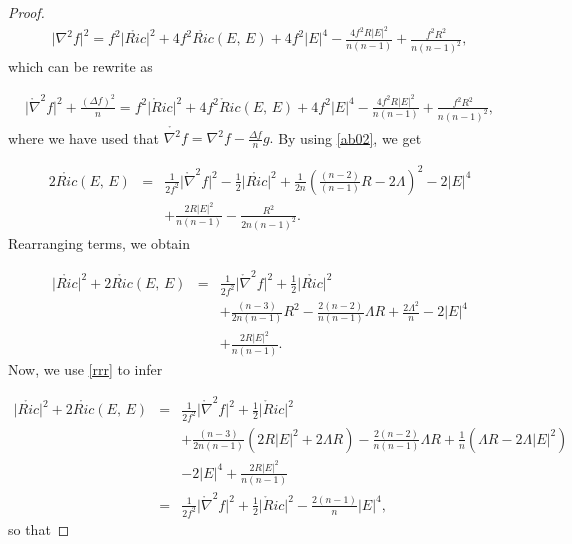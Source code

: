 \documentclass{amsart}
\numberwithin{equation}{section}
\begin{document}
\begin{proof}
		
		\begin{eqnarray*}
			\vert\nabla^2f\vert^{2} = f^2\vert\mathring{Ric}\vert^{2} + 4f^2\mathring{Ric}(E,\,E) + 4f^2\vert E\vert^{4} - \frac{4f^2R\vert E\vert^{2}}{n(n-1)} + \frac{f^2R^2}{n(n-1)^2},
		\end{eqnarray*} which can be rewrite as 
		
				
		\begin{eqnarray*}
			\vert\mathring{\nabla}^2f\vert^{2} + \frac{(\Delta f)^{2}}{n} = f^2\vert\mathring{R}ic\vert^{2} + 4f^2\mathring{R}ic(E,\,E) + 4f^2\vert E\vert^{4} - \frac{4f^2R\vert E\vert^{2}}{n(n-1)} + \frac{f^2R^2}{n(n-1)^2},
		\end{eqnarray*} where we have used that $\mathring{\nabla^2} f = \nabla^2 f-\frac{\Delta f}{n}g.$ By using \eqref{ab02}, we get 
		
		\begin{eqnarray*}
			2\mathring{Ric}(E,\,E) &=& \frac{1}{2f^2}\vert\mathring{\nabla}^2f\vert^{2} - \frac{1}{2}\vert\mathring{Ric}\vert^{2} + \frac{1}{2n}\left(\frac{(n-2)}{(n-1)}R - 2\Lambda\right)^2   - 2\vert E\vert^{4} \nonumber\\
			&&+ \frac{2 R\vert E\vert^{2}}{n(n-1)} - \frac{R^2}{2n(n-1)^2}.
		\end{eqnarray*} Rearranging terms, we obtain
		
	
		\begin{eqnarray*}
			\vert\mathring{Ric}\vert^{2}+ 2\mathring{Ric}(E,\,E) &=& \frac{1}{2f^2}\vert\mathring{\nabla}^2f\vert^{2} + \frac{1}{2}\vert\mathring{Ric}\vert^{2} \nonumber\\
			&&+ \frac{(n-3)}{2n(n-1)}R^2 - \frac{2(n-2)}{n(n-1)}\Lambda R + \frac{2\Lambda^2}{n} - 2\vert E\vert^{4} \nonumber\\&&+ \frac{2 R\vert E\vert^{2}}{n(n-1)}.
		\end{eqnarray*} Now, we use \eqref{rrr} to infer
		
	
	
		\begin{eqnarray*}
			\vert\mathring{Ric}\vert^{2}+ 2\mathring{Ric}(E,\,E) &=& \frac{1}{2f^2}\vert\mathring{\nabla}^2f\vert^{2} + \frac{1}{2}\vert\mathring{R}ic\vert^{2} \nonumber\\
			&&+ \frac{(n-3)}{2n(n-1)}(2R\vert E\vert^{2} + 2\Lambda R) - \frac{2(n-2)}{n(n-1)}\Lambda R + \frac{1}{n}(\Lambda R - 2\Lambda\vert E\vert^{2}) \nonumber\\
			&&- 2\vert E\vert^{4} + \frac{2 R\vert E\vert^{2}}{n(n-1)} \nonumber\\
			&=& \frac{1}{2f^2}\vert\mathring{\nabla}^2f\vert^{2} + \frac{1}{2}\vert\mathring{R}ic\vert^{2} - \frac{2(n-1)}{n}\vert E\vert^{4},
		\end{eqnarray*} so that
		

\end{proof}
\end{document}
